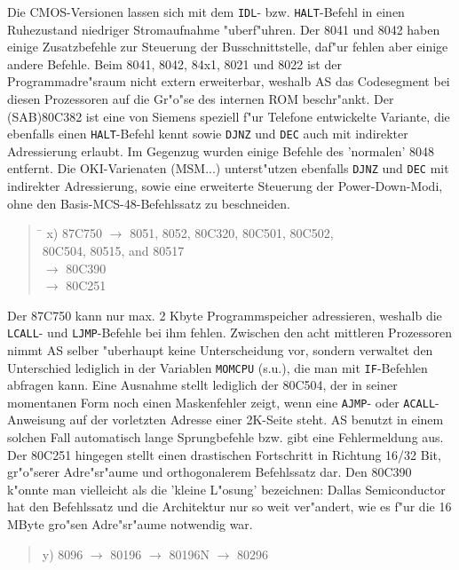 \documentclass[12pt,a4paper,twoside]{report}
\newcommand{\tty}[1]{{\tt #1}}
\begin{document}
Die CMOS-Versionen lassen
sich mit dem \tty{IDL}- bzw. \tty{HALT}-Befehl in einen Ruhezustand niedriger
Stromaufnahme "uberf"uhren.  Der 8041 und 8042 haben einige Zusatzbefehle zur
Steuerung der Busschnittstelle, daf"ur fehlen aber einige andere Befehle.
Beim 8041, 8042, 84x1, 8021 und 8022 ist der Programmadre"sraum nicht
extern erweiterbar, weshalb AS das Codesegment bei diesen Prozessoren
auf die Gr"o"se des internen ROM beschr"ankt.  Der (SAB)80C382 ist eine von
Siemens speziell f"ur Telefone entwickelte Variante, die ebenfalls
einen \tty{HALT}-Befehl kennt sowie \tty{DJNZ} und \tty{DEC} auch
mit indirekter Adressierung erlaubt.  Im Gegenzug wurden einige
Befehle des 'normalen' 8048 entfernt. Die OKI-Varienaten (MSM...)
unterst"utzen ebenfalls \tty{DJNZ} und \tty{DEC} mit indirekter
Adressierung, sowie eine erweiterte Steuerung der
Power-Down-Modi, ohne den Basis-MCS-48-Befehlssatz zu
beschneiden.
\begin{quote}
\begin{tabbing}
\hspace{0.7cm} \= \kill
x) \> 87C750 $\rightarrow$ 8051, 8052, 80C320, 80C501, 80C502, \\
   \> 80C504, 80515, and 80517 \\
   \> $\rightarrow$ 80C390 \\
   \> $\rightarrow$ 80C251
\end{tabbing}
\end{quote}
Der 87C750 kann nur max. 2 Kbyte Programmspeicher adressieren, weshalb
die \tty{LCALL}- und \tty{LJMP}-Befehle bei ihm fehlen.  Zwischen den
acht mittleren Prozessoren nimmt AS selber "uberhaupt keine Unterscheidung
vor, sondern verwaltet den Unterschied lediglich in der Variablen
\tty{MOMCPU} (s.u.), die man mit \tty{IF}-Befehlen abfragen kann.  Eine
Ausnahme stellt lediglich der 80C504, der in seiner momentanen Form noch einen
Maskenfehler zeigt, wenn eine \tty{AJMP}- oder \tty{ACALL}-Anweisung auf der
vorletzten Adresse einer 2K-Seite steht.  AS benutzt in einem solchen
Fall automatisch lange Sprungbefehle bzw. gibt eine Fehlermeldung aus.  Der
80C251 hingegen stellt einen drastischen Fortschritt in Richtung 16/32 Bit,
gr"o"serer Adre"sr"aume und orthogonalerem Befehlssatz dar.  Den 80C390
k"onnte man vielleicht als die 'kleine L"osung' bezeichnen:  Dallas
Semiconductor hat den Befehlssatz und die Architektur nur so weit
ver"andert, wie es f"ur die 16 MByte gro"sen Adre"sr"aume notwendig war.
\begin{quote}
y) 8096 $\rightarrow$ 80196 $\rightarrow$ 80196N $\rightarrow$ 80296
\end{quote}
\end{document}
